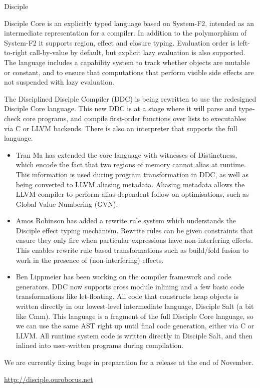 \begin{hcarentry}[section]{Disciple}
\makeheader

Disciple Core is an explicitly typed language based on System-F2, intended as an intermediate representation for a compiler. In addition to the polymorphism of System-F2 it supports region, effect and closure typing. Evaluation order is left-to-right call-by-value by default, but explicit lazy evaluation is also supported. The language includes a capability system to track whether objects are mutable or constant, and to ensure that computations that perform visible side effects are not suspended with lazy evaluation.

The Disciplined Disciple Compiler (DDC) is being rewritten to use the redesigned Disciple Core language. This new DDC is at a stage where it will parse and type-check core programs, and compile first-order functions over lists to executables via C or LLVM backends. There is also an interpreter that supports the full language.

\WhatsNew

\begin{itemize}
\item Tran Ma has extended the core language with witnesses of Distinctness, which encode the fact that two regions of memory cannot alias at runtime. This information is used during program transformation in DDC, as well as being converted to LLVM aliasing metadata. Aliasing metadata allows the LLVM compiler to perform alias dependent follow-on optimisations, such as Global Value Numbering (GVN).

\item Amos Robinson has added a rewrite rule system which understands the Disciple effect typing mechanism. Rewrite rules can be given constraints that ensure they only fire when particular expressions have non-interfering effects. This enables rewrite rule based transformations such as build/fold fusion to work in the presence of (non-interfering) effects.

\item Ben Lippmeier has been working on the compiler framework and code generators. DDC now supports cross module inlining and a few basic code transformations like let-floating. All code that constructs heap objects is written directly in our lowest-level intermediate language, Disciple Salt (a bit like Cmm). This language is a fragment of the full Disciple Core language, so we can use the same AST right up until final code generation, either via C or LLVM. All runtime system code is written directly in Disciple Salt, and then inlined into user-written programs during compilation.
\end{itemize}

\FuturePlans
We are currently fixing bugs in preparation for a release at the end of November.

\FurtherReading
  \url{http://disciple.ouroborus.net}
\end{hcarentry}
